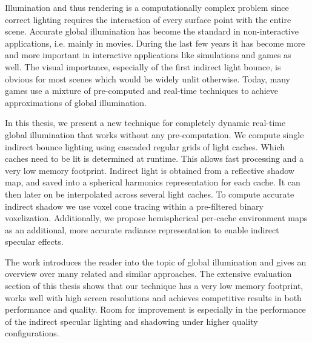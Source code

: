 \documentclass[thesis.tex]{subfiles}
\begin{document}

Illumination and thus rendering is a computationally complex problem since correct lighting requires the interaction of every surface point with the entire scene.
Accurate global illumination has become the standard in non-interactive applications, i.e. mainly in movies.
During the last few years it has become more and more important in interactive applications like simulations and games as well.
The visual importance, especially of the first indirect light bounce, is obvious for most scenes which would be widely unlit otherwise.
Today, many games use a mixture of pre-computed and real-time techniques to achieve approximations of global illumination.

In this thesis, we present a new technique for completely dynamic real-time global illumination that works without any pre-computation.
We compute single indirect bounce lighting using cascaded regular grids of light caches.
Which caches need to be lit is determined at runtime.
This allows fast processing and a very low memory footprint.
Indirect light is obtained from a reflective shadow map, and saved into a spherical harmonics representation for each cache.
It can then later on be interpolated across several light caches.
To compute accurate indirect shadow we use voxel cone tracing within a pre-filtered binary voxelization.
Additionally, we propose hemispherical per-cache environment maps as an additional, more accurate radiance representation to enable indirect specular effects.

The work introduces the reader into the topic of global illumination and gives an overview over many related and similar approaches.
The extensive evaluation section of this thesis shows that our technique has a very low memory footprint, works well with high screen resolutions and achieves competitive results in both performance and quality.
Room for improvement is especially in the performance of the indirect specular lighting and shadowing under higher quality configurations.
\end{document}
